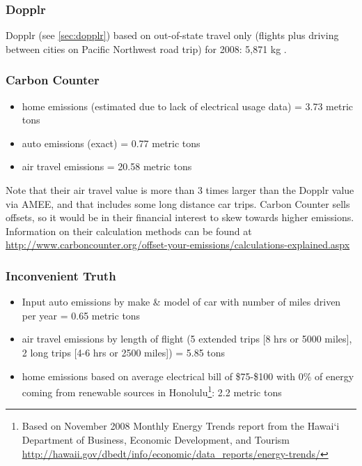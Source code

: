 \subsubsection{Dopplr}
Dopplr (see \autoref{sec:dopplr}) based on out-of-state travel only (flights plus driving between cities on Pacific Northwest road trip) for 2008: 5,871 kg \COtwo.

\subsubsection{Carbon Counter}
\begin{itemize}
	\item home emissions (estimated due to lack of electrical usage data) = 3.73 metric tons \COtwo
	\item auto emissions (exact) = 0.77 metric tons \COtwo
	\item air travel emissions = 20.58 metric tons \COtwo
\end{itemize}

Note that their air travel \COtwo value is more than 3 times larger than the Dopplr value via AMEE, and that includes some long distance car trips. Carbon Counter sells offsets, so it would be in their financial interest to skew towards higher emissions. Information on their calculation methods can be found at \url{http://www.carboncounter.org/offset-your-emissions/calculations-explained.aspx}

\subsubsection{Inconvenient Truth}
\begin{itemize}
	\item Input auto emissions by make \& model of car with number of miles driven per year = 0.65 metric tons \COtwo
	\item air travel emissions by length of flight (5 extended trips [8 hrs or 5000 miles], 2 long trips [4-6 hrs or 2500 miles]) = 5.85 tons \COtwo
	\item home emissions based on average electrical bill of \$75-\$100 with 0\% of energy coming from renewable sources in Honolulu\footnote{Based on November 2008 Monthly Energy Trends report from the Hawai`i Department of Business, Economic Development, and Tourism \url{http://hawaii.gov/dbedt/info/economic/data_reports/energy-trends/}}: 2.2 metric tons \COtwo
\end{itemize}